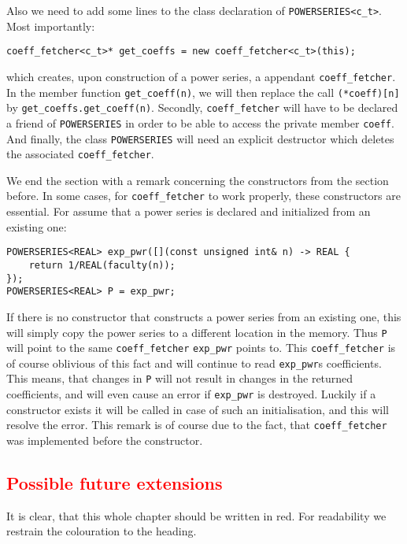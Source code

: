 \documentclass{article}
\newcommand{\code}[1]{\texttt{#1}}
\newcommand{\func}[1]{\texttt{#1}}
\newcommand{\temp}[1]{\textcolor{red}{#1}}
\begin{document}
Also we need to add some lines to the class declaration of \func{POWERSERIES<c\_t>}. Most importantly:
\begin{lstlisting}
coeff_fetcher<c_t>* get_coeffs = new coeff_fetcher<c_t>(this);
\end{lstlisting}
which creates, upon construction of a power series, a appendant \code{coeff\_fetcher}. In the member function \code{get\_coeff(n)}, we will then replace the call \code{(*coeff)[n]} by \code{get\_coeffs.get\_coeff(n)}. Secondly, \code{coeff\_fetcher} will have to be declared a friend of \func{POWERSERIES} in order to be able to access the private member \code{coeff}. And finally, the class \func{POWERSERIES} will need an explicit destructor which deletes the associated \code{coeff\_fetcher}.

We end the section with a remark concerning the constructors from the section before. In some cases, for \code{coeff\_fetcher} to work properly, these constructors are essential. For assume that a power series is declared and initialized from an existing one:
\begin{lstlisting}
POWERSERIES<REAL> exp_pwr([](const unsigned int& n) -> REAL {
	return 1/REAL(faculty(n));
});
POWERSERIES<REAL> P = exp_pwr;
\end{lstlisting}
If there is no constructor that constructs a power series from an existing one, this will simply copy the power series to a different location in the memory. Thus \code{P} will point to the same \code{coeff\_fetcher} \code{exp\_pwr} points to. This \code{coeff\_fetcher} is of course oblivious of this fact and will continue to read \code{exp\_pwr}s coefficients. This means, that changes in \code{P} will not result in changes in the returned coefficients, and will even cause an error if \code{exp\_pwr} is destroyed. Luckily if a constructor exists it will be called in case of such an initialisation, and this will resolve the error. This remark is of course due to the fact, that \code{coeff\_fetcher} was implemented before the constructor.

\subsection{\temp{Possible future extensions}}

It is clear, that this whole chapter should be written in red. For readability we restrain the colouration to the heading.

{}

\end{document}
